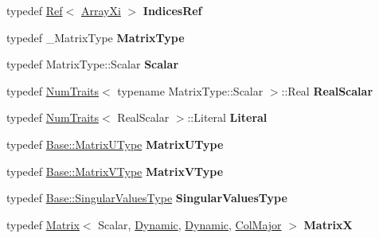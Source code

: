 \begin{DoxyCompactItemize}
typedef \hyperlink{group___core___module_class_eigen_1_1_ref}{Ref}$<$ \hyperlink{group___core___module}{Array\+Xi} $>$ {\bfseries Indices\+Ref}
\item 
\mbox{\label{group___s_v_d___module_a8c3310eee662af4ca2428f7afd1472ed}} 
typedef \+\_\+\+Matrix\+Type {\bfseries Matrix\+Type}
\item 
\mbox{\label{group___s_v_d___module_aaeab2cfc3f87e2a2c595a9d5b4d97c71}} 
typedef Matrix\+Type\+::\+Scalar {\bfseries Scalar}
\item 
\mbox{\label{group___s_v_d___module_a2eb49279d7a1760eed1346fb8a0da629}} 
typedef \hyperlink{group___core___module_struct_eigen_1_1_num_traits}{Num\+Traits}$<$ typename Matrix\+Type\+::\+Scalar $>$\+::Real {\bfseries Real\+Scalar}
\item 
\mbox{\label{group___s_v_d___module_aad17038f9628ce5ed6e1461a67cd3a03}} 
typedef \hyperlink{group___core___module_struct_eigen_1_1_num_traits}{Num\+Traits}$<$ Real\+Scalar $>$\+::Literal {\bfseries Literal}
\item 
\mbox{\label{group___s_v_d___module_a4c38005126c75b1ba3b1b95117b4546d}} 
typedef \hyperlink{group___core___module}{Base\+::\+Matrix\+U\+Type} {\bfseries Matrix\+U\+Type}
\item 
\mbox{\label{group___s_v_d___module_a1a1140cddb7727637b5e33d9f3b13299}} 
typedef \hyperlink{group___core___module}{Base\+::\+Matrix\+V\+Type} {\bfseries Matrix\+V\+Type}
\item 
\mbox{\label{group___s_v_d___module_a44cd685aa8d3807c006f6557bd69abf8}} 
typedef \hyperlink{class_eigen_1_1internal_1_1_tensor_lazy_evaluator_writable}{Base\+::\+Singular\+Values\+Type} {\bfseries Singular\+Values\+Type}
\item 
\mbox{\label{group___s_v_d___module_acf9211e5353d60fc3209d62fa0e2bdf7}} 
typedef \hyperlink{group___core___module_class_eigen_1_1_matrix}{Matrix}$<$ Scalar, \hyperlink{namespace_eigen_ad81fa7195215a0ce30017dfac309f0b2}{Dynamic}, \hyperlink{namespace_eigen_ad81fa7195215a0ce30017dfac309f0b2}{Dynamic}, \hyperlink{group__enums_ggaacded1a18ae58b0f554751f6cdf9eb13a0cbd4bdd0abcfc0224c5fcb5e4f6669a}{Col\+Major} $>$ {\bfseries MatrixX}

\end{DoxyCompactItemize}
